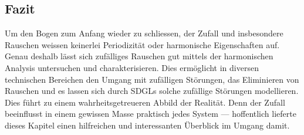 \subsection{Fazit\label{brown:fazit}}

Um den Bogen zum Anfang wieder zu schliessen, der Zufall und insbesondere Rauschen weissen keinerlei Periodizität oder harmonische Eigenschaften auf. Genau deshalb lässt sich zufälliges Rauschen gut mittels der harmonischen Analysis untersuchen und charakterisieren. Dies ermöglicht in diversen technischen Bereichen den Umgang mit zufälligen Störungen, das Eliminieren von Rauschen und es lassen sich durch SDGLs solche zufällige Störungen modellieren. Dies führt zu einem wahrheitsgetreueren Abbild der Realität. Denn der Zufall beeinflusst in einem gewissen Masse praktisch jedes System --- hoffentlich lieferte dieses Kapitel einen hilfreichen und interessanten Überblick im Umgang damit.
